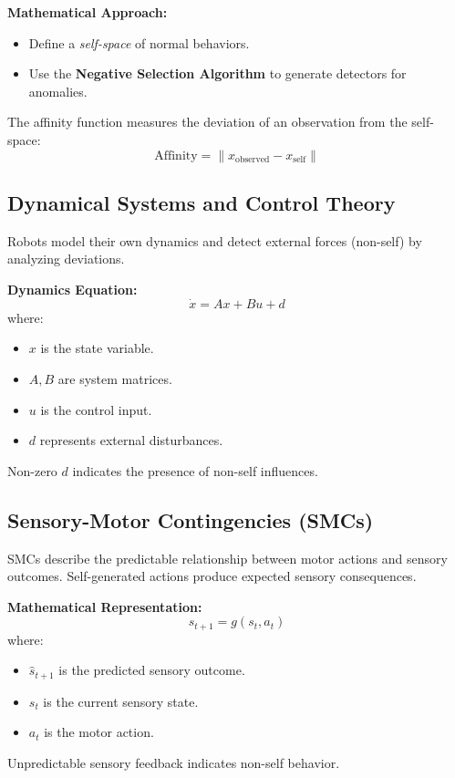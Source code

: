 \textbf{Mathematical Approach:}
\begin{itemize}
    \item Define a \textit{self-space} of normal behaviors.
    \item Use the \textbf{Negative Selection Algorithm} to generate detectors for anomalies.
\end{itemize}

The affinity function measures the deviation of an observation from the self-space:
\begin{equation}
\text{Affinity} = \| x_{\text{observed}} - x_{\text{self}} \|
\end{equation}

\subsection{Dynamical Systems and Control Theory}
Robots model their own dynamics and detect external forces (non-self) by analyzing deviations.

\textbf{Dynamics Equation:}
\begin{equation}
\dot{x} = Ax + Bu + d
\end{equation}
where:
\begin{itemize}
    \item \( x \) is the state variable.
    \item \( A, B \) are system matrices.
    \item \( u \) is the control input.
    \item \( d \) represents external disturbances.
\end{itemize}
Non-zero \( d \) indicates the presence of non-self influences.

\subsection{Sensory-Motor Contingencies (SMCs)}
SMCs describe the predictable relationship between motor actions and sensory outcomes. Self-generated actions produce expected sensory consequences.

\textbf{Mathematical Representation:}
\begin{equation}
\hat{s}_{t+1} = g(s_t, a_t)
\end{equation}
where:
\begin{itemize}
    \item \( \hat{s}_{t+1} \) is the predicted sensory outcome.
    \item \( s_t \) is the current sensory state.
    \item \( a_t \) is the motor action.
\end{itemize}
Unpredictable sensory feedback indicates non-self behavior.

